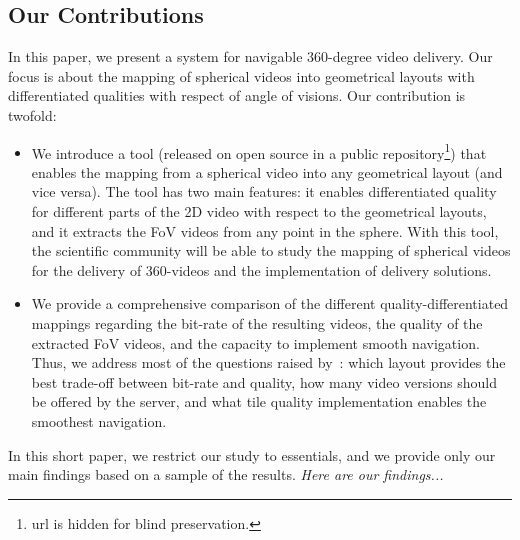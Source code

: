 \subsection{Our Contributions}

In this paper, we present a system for navigable 360-degree video delivery. Our focus is
about the mapping of spherical videos into geometrical layouts with differentiated qualities
with respect of angle of visions. Our contribution is twofold:
\begin{itemize}
\item We introduce a tool (released on open source in a public repository\footnote{url is hidden for blind
preservation.}) that enables the mapping from a spherical video
into any geometrical layout (and vice versa). The tool has two main features: it enables differentiated
quality for different parts of the 2D video with respect to the geometrical layouts, and it extracts the 
\ac{FoV} videos from any point in the sphere. With this tool, the scientific community will be able to 
study the mapping of spherical videos for the delivery of 360-videos and the implementation of delivery 
solutions.
\item We provide a comprehensive comparison of the different quality-differentiated 
mappings regarding
the bit-rate of the resulting videos, the quality of the extracted \ac{FoV} videos, and the capacity to
implement smooth navigation. Thus, we address most of
the questions raised by~\citet{facebook}: which layout provides the best trade-off between bit-rate and
quality, how many video versions should be offered by the server, and what tile quality implementation 
enables the smoothest navigation.
\end{itemize}

In this short paper, we restrict our study to essentials, and we provide only our main findings based on a 
sample of the results. \textit{Here are our findings...}




